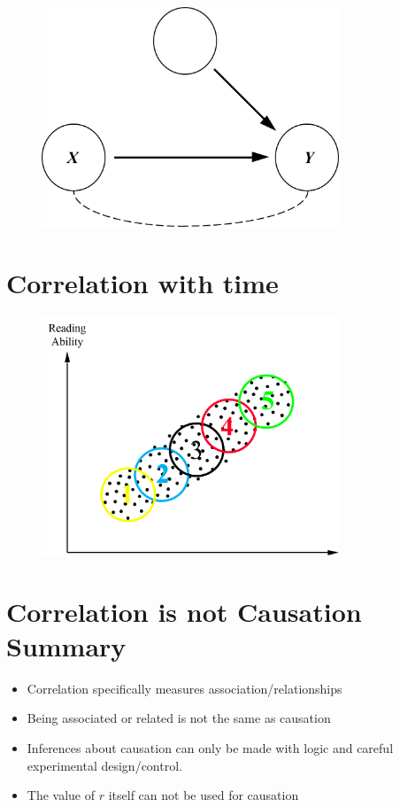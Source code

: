 \documentclass[12pt]{article}
\begin{document}
\begin{figure}[H]
\centering
\includegraphics[width=3.5in]{confounding.png}
\caption{}
\end{figure}

\section{Correlation with time}\label{correlation-with-time}

\begin{figure}[H]
\centering
\includegraphics[width=3.5in]{corr_time.png}
\caption{}
\end{figure}

\section{Correlation is not Causation
Summary}\label{correlation-is-not-causation-summary}

\begin{itemize}
\itemsep1pt\parskip0pt
\item
  Correlation specifically measures association/relationships
\item
  Being associated or related is not the same as causation
\item
  Inferences about causation can only be made with logic and careful
  experimental design/control.
\item
  The value of \(r\) itself can not be used for causation
\end{itemize}
\end{document}
